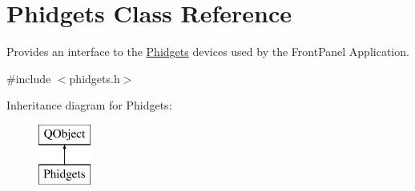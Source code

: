 \hypertarget{class_phidgets}{\section{Phidgets Class Reference}
\label{class_phidgets}
}


Provides an interface to the \hyperlink{class_phidgets}{Phidgets} devices used by the Front\-Panel Application.  




{\ttfamily \#include $<$phidgets.\-h$>$}

Inheritance diagram for Phidgets\-:\begin{figure}[H]
\begin{center}
\leavevmode
\includegraphics[height=2.000000cm]{class_phidgets}
\end{center}
\end{figure}
